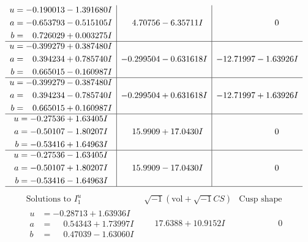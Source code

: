 \documentclass[1p]{elsarticle_modified}
\theoremstyle{definition}
\newcommand{\I}{\sqrt{-1}}
\begin{document}
$$\begin{array}{c|c|c}
\begin{aligned}
u &= -0.190013 - 1.391680 I \\
a &= -0.653793 - 0.515105 I \\
b &= \phantom{-}0.726029 + 0.003275 I\end{aligned}
 & \phantom{-}4.70756 - 6.35711 I & \phantom{-0.000000 } 0 \\ \hline\begin{aligned}
u &= -0.399279 + 0.387480 I \\
a &= \phantom{-}0.394234 + 0.785740 I \\
b &= \phantom{-}0.665015 - 0.160987 I\end{aligned}
 & -0.299504 - 0.631618 I & -12.71997 - 1.63926 I \\ \hline\begin{aligned}
u &= -0.399279 - 0.387480 I \\
a &= \phantom{-}0.394234 - 0.785740 I \\
b &= \phantom{-}0.665015 + 0.160987 I\end{aligned}
 & -0.299504 + 0.631618 I & -12.71997 + 1.63926 I \\ \hline\begin{aligned}
u &= -0.27536 + 1.63405 I \\
a &= -0.50107 - 1.80207 I \\
b &= -0.53416 + 1.64963 I\end{aligned}
 & \phantom{-}15.9909 + 17.0430 I & \phantom{-0.000000 } 0 \\ \hline\begin{aligned}
u &= -0.27536 - 1.63405 I \\
a &= -0.50107 + 1.80207 I \\
b &= -0.53416 - 1.64963 I\end{aligned}
 & \phantom{-}15.9909 - 17.0430 I & \phantom{-0.000000 } 0\\
 \hline 
 \end{array}$$\newpage$$\begin{array}{c|c|c}  
\text{Solutions to }I^u_{1}& \I (\text{vol} + \sqrt{-1}CS) & \text{Cusp shape}\\
 \hline 
\begin{aligned}
u &= -0.28713 + 1.63936 I \\
a &= \phantom{-}0.54343 + 1.73997 I \\
b &= \phantom{-}0.47039 - 1.63060 I\end{aligned}
 & \phantom{-}17.6388 + 10.9152 I & \phantom{-0.000000 } 0 \\ \hline\begin{aligned}

\end{aligned}
\end{array}$$
\end{document}
